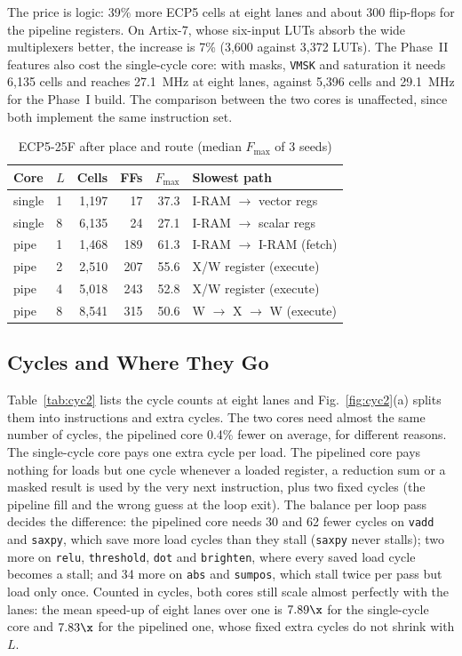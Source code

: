 The price is logic: 39\% more ECP5 cells at eight lanes and about 300 flip-flops for the
pipeline registers. On Artix-7, whose six-input LUTs absorb the wide multiplexers better,
the increase is 7\% (3,600 against 3,372 LUTs). The Phase~II features also cost the
single-cycle core: with masks, \texttt{VMSK} and saturation it needs 6,135 cells and
reaches 27.1~MHz at eight lanes, against 5,396 cells and 29.1~MHz for the Phase~I build.
The comparison between the two cores is unaffected, since both implement the same
instruction set.

\begin{table}[t]
\centering
\caption{ECP5-25F after place and route (median $F_{\max}$ of 3 seeds)}
\label{tab:fpga2}
\footnotesize
\begin{tabular}{@{}llrrrl@{}}
\toprule
Core & $L$ & Cells & FFs & $F_{\max}$ & Slowest path \\
\midrule
single & 1 & 1,197 & 17  & 37.3 & I-RAM $\to$ vector regs \\
single & 8 & 6,135 & 24  & 27.1 & I-RAM $\to$ scalar regs \\
pipe   & 1 & 1,468 & 189 & 61.3 & I-RAM $\to$ I-RAM (fetch) \\
pipe   & 2 & 2,510 & 207 & 55.6 & X/W register (execute) \\
pipe   & 4 & 5,018 & 243 & 52.8 & X/W register (execute) \\
pipe   & 8 & 8,541 & 315 & 50.6 & W $\to$ X $\to$ W (execute) \\
\bottomrule
\end{tabular}
\end{table}

\subsection{Cycles and Where They Go}
Table~\ref{tab:cyc2} lists the cycle counts at eight lanes and Fig.~\ref{fig:cyc2}(a)
splits them into instructions and extra cycles. The two cores need almost the same
number of cycles, the pipelined core 0.4\% fewer on average, for different reasons. The
single-cycle core pays one extra cycle per load. The pipelined core pays nothing for
loads but one cycle whenever a loaded register, a reduction sum or a masked result is
used by the very next instruction, plus two fixed cycles (the pipeline fill and the
wrong guess at the loop exit). The balance per loop pass decides the difference: the
pipelined core needs 30 and 62 fewer cycles on \texttt{vadd} and \texttt{saxpy}, which
save more load cycles than they stall (\texttt{saxpy} never stalls); two more on
\texttt{relu}, \texttt{threshold}, \texttt{dot} and \texttt{brighten}, where every saved
load cycle becomes a stall; and 34 more on \texttt{abs} and \texttt{sumpos}, which stall
twice per pass but load only once. Counted in cycles, both cores still scale almost perfectly with the lanes:
the mean speed-up of eight lanes over one is $7.89\x$ for the single-cycle core and
$7.83\x$ for the pipelined one, whose fixed extra cycles do not shrink with $L$.

